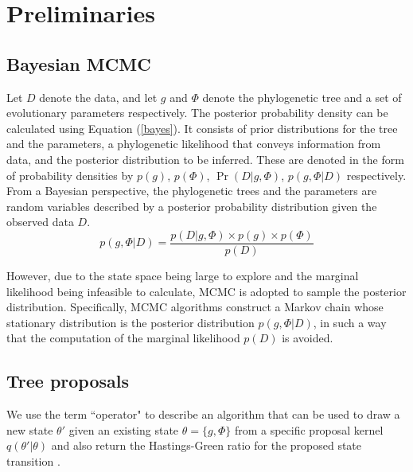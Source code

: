 \documentclass{bmcart}
\begin{document}
\section*{Preliminaries}
\subsection*{Bayesian MCMC}
Let $D$ denote the data, and let $g$ and $\Phi $ denote the phylogenetic tree and a set of evolutionary parameters respectively. The posterior probability density can be calculated using Equation (\ref{bayes}). It consists of prior distributions for the  tree and the parameters, a phylogenetic likelihood that conveys information from data, and the posterior distribution to be inferred. These are denoted in the form of probability densities by $p(g) $, $p(\Phi )$, $\Pr(D|g,\Phi )$, $p(g,\Phi |D)$ respectively. From a Bayesian perspective, the phylogenetic trees and the parameters are random variables described by a posterior probability distribution given the observed data $D$.
\begin{equation}\label{bayes}
p(g,\Phi |D) = \frac{{p (D|g,\Phi ) \times p (g) \times p (\Phi )}}{{p (D)}}
\end{equation}

However, due to the state space being large to explore and the marginal likelihood being infeasible to calculate, MCMC is adopted to sample the posterior distribution. Specifically, MCMC algorithms construct a Markov chain whose stationary distribution is the posterior distribution $p(g,\Phi |D)$, in such a way that the computation of the marginal likelihood $p (D)$ is avoided.
\subsection*{Tree proposals}
\label{treeproposals}
We use the term ``operator" to describe an algorithm that can be used to draw a new state $\theta'$ given an existing state $\theta = \{g,\Phi\}$ from a specific proposal kernel $q(\theta'|\theta)$ and also return the Hastings-Green ratio for the proposed state transition \cite{hastings1970monte,green1995reversible}.
\end{document}
